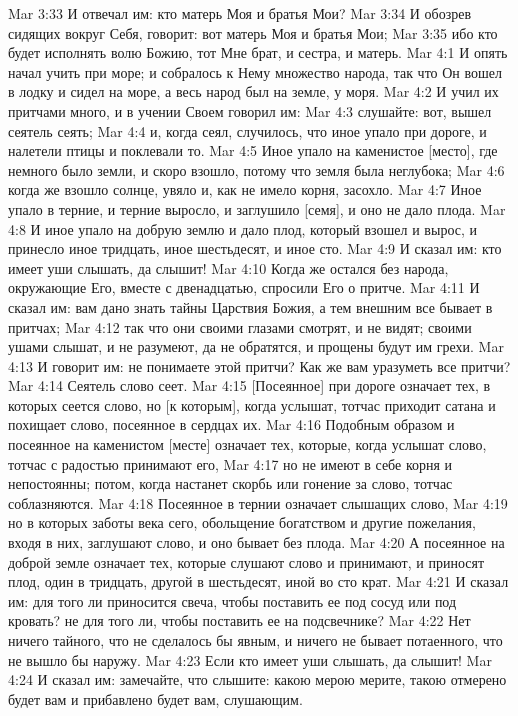 Mar 3:33  И отвечал им: кто матерь Моя и братья Мои?
Mar 3:34  И обозрев сидящих вокруг Себя, говорит: вот матерь Моя и братья Мои;
Mar 3:35  ибо кто будет исполнять волю Божию, тот Мне брат, и сестра, и матерь.
Mar 4:1  И опять начал учить при море; и собралось к Нему множество народа, так что Он вошел в лодку и сидел на море, а весь народ был на земле, у моря.
Mar 4:2  И учил их притчами много, и в учении Своем говорил им:
Mar 4:3  слушайте: вот, вышел сеятель сеять;
Mar 4:4  и, когда сеял, случилось, что иное упало при дороге, и налетели птицы и поклевали то.
Mar 4:5  Иное упало на каменистое [место], где немного было земли, и скоро взошло, потому что земля была неглубока;
Mar 4:6  когда же взошло солнце, увяло и, как не имело корня, засохло.
Mar 4:7  Иное упало в терние, и терние выросло, и заглушило [семя], и оно не дало плода.
Mar 4:8  И иное упало на добрую землю и дало плод, который взошел и вырос, и принесло иное тридцать, иное шестьдесят, и иное сто.
Mar 4:9  И сказал им: кто имеет уши слышать, да слышит!
Mar 4:10  Когда же остался без народа, окружающие Его, вместе с двенадцатью, спросили Его о притче.
Mar 4:11  И сказал им: вам дано знать тайны Царствия Божия, а тем внешним все бывает в притчах;
Mar 4:12  так что они своими глазами смотрят, и не видят; своими ушами слышат, и не разумеют, да не обратятся, и прощены будут им грехи.
Mar 4:13  И говорит им: не понимаете этой притчи? Как же вам уразуметь все притчи?
Mar 4:14  Сеятель слово сеет.
Mar 4:15  [Посеянное] при дороге означает тех, в которых сеется слово, но [к которым], когда услышат, тотчас приходит сатана и похищает слово, посеянное в сердцах их.
Mar 4:16  Подобным образом и посеянное на каменистом [месте] означает тех, которые, когда услышат слово, тотчас с радостью принимают его,
Mar 4:17  но не имеют в себе корня и непостоянны; потом, когда настанет скорбь или гонение за слово, тотчас соблазняются.
Mar 4:18  Посеянное в тернии означает слышащих слово,
Mar 4:19  но в которых заботы века сего, обольщение богатством и другие пожелания, входя в них, заглушают слово, и оно бывает без плода.
Mar 4:20  А посеянное на доброй земле означает тех, которые слушают слово и принимают, и приносят плод, один в тридцать, другой в шестьдесят, иной во сто крат.
Mar 4:21  И сказал им: для того ли приносится свеча, чтобы поставить ее под сосуд или под кровать? не для того ли, чтобы поставить ее на подсвечнике?
Mar 4:22  Нет ничего тайного, что не сделалось бы явным, и ничего не бывает потаенного, что не вышло бы наружу.
Mar 4:23  Если кто имеет уши слышать, да слышит!
Mar 4:24  И сказал им: замечайте, что слышите: какою мерою мерите, такою отмерено будет вам и прибавлено будет вам, слушающим.
